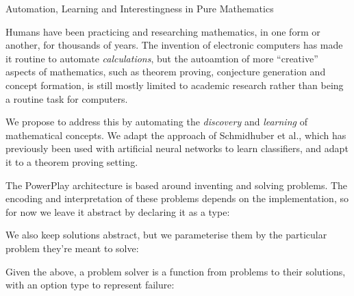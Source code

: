 Automation, Learning and Interestingness in Pure Mathematics

Humans have been practicing and researching mathematics, in one form or another,
for thousands of years. The invention of electronic computers has made it
routine to automate \emph{calculations}, but the autoamtion of more ``creative''
aspects of mathematics, such as theorem proving, conjecture generation and
concept formation, is still mostly limited to academic research rather than
being a routine task for computers.

We propose to address this by automating the \emph{discovery} and
\emph{learning} of mathematical concepts. We adapt the approach of Schmidhuber
et al., which has previously been used with artificial neural networks to learn
classifiers, and adapt it to a theorem proving setting.


The PowerPlay architecture is based around inventing and solving problems. The
encoding and interpretation of these problems depends on the implementation, so
for now we leave it abstract by declaring it as a type:


We also keep solutions abstract, but we parameterise them by the particular
problem they're meant to solve:


Given the above, a problem solver is a function from problems to their
solutions, with an option type to represent failure:

